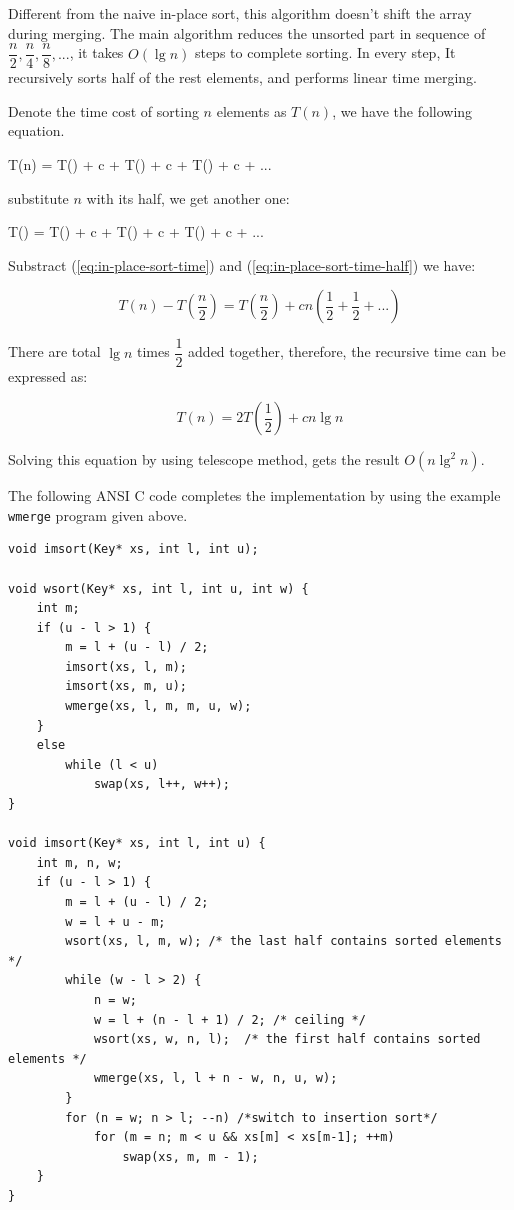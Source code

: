 \documentclass[b5paper]{article}
\begin{document}
Different from the naive in-place sort, this algorithm doesn't shift the array during merging. The main
algorithm reduces the unsorted part in sequence of $\dfrac{n}{2}, \dfrac{n}{4}, \dfrac{n}{8}, ...$, it takes $O(\lg n)$ steps to complete
sorting. In every step, It recursively sorts half of the rest elements, and performs linear time merging.

Denote the time cost of sorting $n$ elements as $T(n)$, we have the following equation.

\be
T(n) = T() + c  + T() + c  + T() + c  + ...
\label{eq:in-place-sort-time}
\ee

substitute $n$ with its half, we get another one:

\be
T() = T() + c  + T() + c  + T() + c  + ...
\label{eq:in-place-sort-time-half}
\ee

Substract (\ref{eq:in-place-sort-time}) and (\ref{eq:in-place-sort-time-half}) we have:

\[
T(n) - T(\frac{n}{2}) = T(\frac{n}{2}) + c n (\frac{1}{2} + \frac{1}{2} + ... )
\]

There are total $\lg n$ times $\dfrac{1}{2}$ added together, therefore, the recursive time can be expressed as:

\[
T(n) = 2 T(\frac{1}{2}) + c n \lg n
\]

Solving this equation by using telescope method, gets the result $O(n \lg^2 n)$.

The following ANSI C code completes the implementation by using the example \texttt{wmerge} program given
above.

\lstset{language=C}
\begin{lstlisting}
void imsort(Key* xs, int l, int u);

void wsort(Key* xs, int l, int u, int w) {
    int m;
    if (u - l > 1) {
        m = l + (u - l) / 2;
        imsort(xs, l, m);
        imsort(xs, m, u);
        wmerge(xs, l, m, m, u, w);
    }
    else
        while (l < u)
            swap(xs, l++, w++);
}

void imsort(Key* xs, int l, int u) {
    int m, n, w;
    if (u - l > 1) {
        m = l + (u - l) / 2;
        w = l + u - m;
        wsort(xs, l, m, w); /* the last half contains sorted elements */
        while (w - l > 2) {
            n = w;
            w = l + (n - l + 1) / 2; /* ceiling */
            wsort(xs, w, n, l);  /* the first half contains sorted elements */
            wmerge(xs, l, l + n - w, n, u, w);
        }
        for (n = w; n > l; --n) /*switch to insertion sort*/
            for (m = n; m < u && xs[m] < xs[m-1]; ++m)
                swap(xs, m, m - 1);
    }
}
\end{lstlisting}
\end{document}
